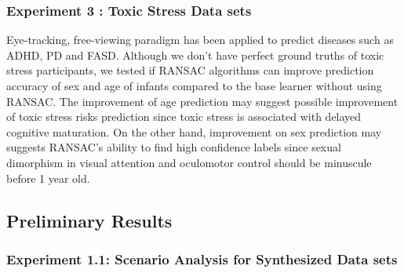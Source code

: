 \documentclass[a4paper, times, 12pt, ,onecolumn,oneside,top=1.0cm,bottom=1.0cm,left=1.0 cm,right=1cm]{article}
\begin{document}
\subsubsection{Experiment 3 : Toxic Stress Data sets}
Eye-tracking, free-viewing paradigm has been applied to predict diseases such as ADHD, PD and FASD. Although we don't have perfect ground truths of toxic stress participants, we tested if RANSAC algorithms can improve prediction accuracy of sex and age of infants compared to the base learner without using RANSAC. The improvement of age prediction may suggest possible improvement of toxic stress risks prediction since toxic stress is associated with delayed cognitive maturation. On the other hand, improvement on sex prediction may suggests RANSAC's ability to find high confidence labels since sexual dimorphism in visual attention and oculomotor control should be minuscule before 1 year old.      
    
\subsection{ Preliminary Results}
\subsubsection{Experiment 1.1: Scenario Analysis for Synthesized Data sets}
\end{document}

